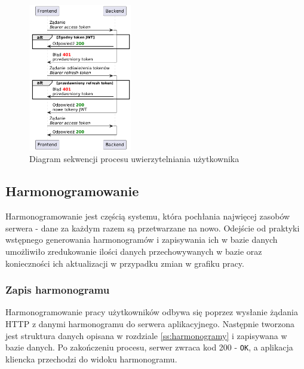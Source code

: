 \begin{figure} [H]
    \centering
    \includegraphics[width=0.4\textwidth]{graf/jwtSeq.png}
    \caption{Diagram sekwencji procesu uwierzytelniania użytkownika}
    \label{fig:authSequence}
\end{figure}

\subsection{Harmonogramowanie}

Harmonogramowanie jest częścią systemu, która pochłania najwięcej zasobów serwera - dane za każdym razem są przetwarzane na nowo. Odejście od praktyki wstępnego generowania harmonogramów i zapisywania ich w bazie danych umożliwiło zredukowanie ilości danych przechowywanych w bazie oraz konieczności ich aktualizacji w przypadku zmian w grafiku pracy.

\subsubsection{Zapis harmonogramu}

Harmonogramowanie pracy użytkowników odbywa się poprzez wysłanie żądania HTTP z danymi harmonogramu do serwera aplikacyjnego. Następnie tworzona jest struktura danych opisana w rozdziale \ref{ss:harmonogramy} i zapisywana w bazie danych. Po zakończeniu procesu, serwer zwraca kod 200 - \texttt{OK}, a aplikacja kliencka przechodzi do widoku harmonogramu.

